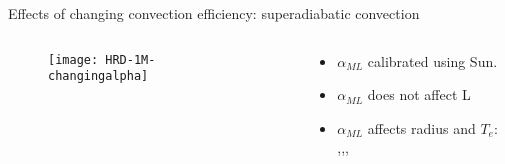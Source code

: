 \begin{frame}{Effects of changing convection efficiency: superadiabatic convection}
\begin{columns}[T]
\begin{column}{0.5\textwidth}
\begin{figure}[!ht]\texttt{[image: HRD-1M-changingalpha]}\label{fig:HRD-changingHe}
\end{figure}
\end{column}
\begin{column}{0.5\textwidth}
\begin{itemize}
    \item $\alpha_{ML}$ calibrated using Sun.
    \item $\alpha_{ML}$ does not affect L
    \item $\alpha_{ML}$ affects radius and $T_e$: \xaumenta{\alpha},\xdiminuisce{\nabla},,
\end{itemize}
\end{column}
\end{columns}
\end{frame}

